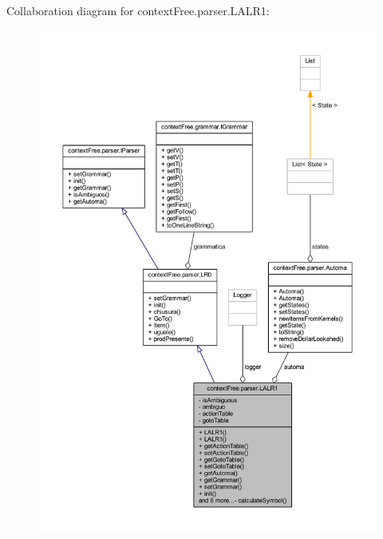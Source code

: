 Collaboration diagram for context\-Free.\-parser.\-L\-A\-L\-R1\-:
\nopagebreak
\begin{figure}[H]
\begin{center}
\leavevmode
\includegraphics[width=350pt]{classcontext_free_1_1parser_1_1_l_a_l_r1__coll__graph}
\end{center}
\end{figure}
